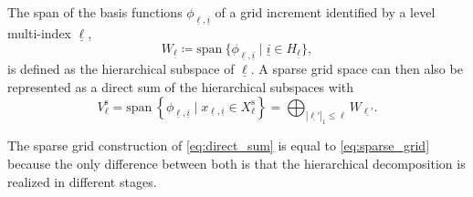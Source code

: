 \documentclass[
  a4paper,  %
  twoside,  %
  bibliography=totoc,
  headsepline,
  cleardoublepage=empty,
  parskip=half,
  draft=false
]{scrbook}
\begin{document}
\begin{definition}
The span of the basis functions $\phi_{\underline{\ell},\underline{i}}$ of a grid increment identified by a level multi-index $\underline{\ell}$,
\begin{equation}
W_{\underline{\ell}} \coloneqq \mathrm{span}~ \{\phi_{\underline{\ell},\underline{i}} \mid \underline{i} \in H_{\underline{\ell}}\},
\end{equation}
is defined as the hierarchical subspace of $\underline{\ell}$.
A sparse grid space can then also be represented as a direct sum of the hierarchical subspaces with
\begin{equation}
V^{\mathrm{s}}_{\ell} = \mathrm{span}~ \left\{\phi_{\underline{\ell},\underline{i}} \mid x_{\underline{\ell},\underline{i}} \in X^{\mathrm{s}}_{\ell}\right\}=\bigoplus_{|\underline{\ell'}|_1 \leq \ell} W_{\underline{\ell'}}.
\label{eq:direct_sum}
\end{equation}
\end{definition}
%
The sparse grid construction of \cref{eq:direct_sum} is equal to \cref{eq:sparse_grid} because the only difference between both is that the hierarchical decomposition is realized in different stages.
\end{document}
